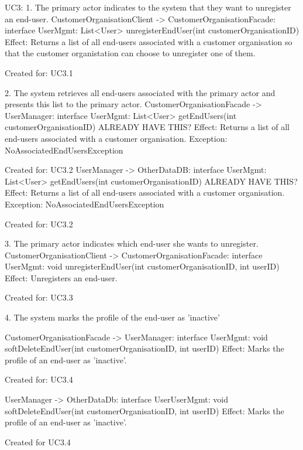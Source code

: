     UC3:
        1. The primary actor indicates to the system that they want to unregister an end-user.
            CustomerOrganisationClient -> CustomerOrganisationFacade: interface UserMgmt: List<User> unregisterEndUser(int customerOrganisationID)
                Effect: Returns a list of all end-users associated with a customer organisation so that the customer organistation can choose to unregister one of them.
                \item Created for: UC3.1

        2. The system retrieves all end-users associated with the primary actor and presents this list to the primary actor.
            CustomerOrganisationFacade -> UserManager: interface UserMgmt: List<User> getEndUsers(int customerOrganisationID) ALREADY HAVE THIS?
                Effect: Returns a list of all end-users associated with a customer organisation.
                Exception: NoAssociatedEndUsersException
                \item Created for: UC3.2
            UserManager -> OtherDataDB: interface UserMgmt: List<User> getEndUsers(int customerOrganisationID) ALREADY HAVE THIS?
                Effect: Returns a list of all end-users associated with a customer organisation.
                Exception: NoAssociatedEndUsersException
                \item Created for: UC3.2

        3. The primary actor indicates which end-user she wants to unregister.
            CustomerOrganisationClient -> CustomerOrganisationFacade: interface UserMgmt: void unregisterEndUser(int customerOrganisationID, int userID)
                Effect: Unregisters an end-user.
                \item Created for: UC3.3

        4. The system marks the profile of the end-user as 'inactive'

            CustomerOrganisationFacade -> UserManager: interface UserMgmt: void softDeleteEndUser(int customerOrganisationID, int userID)
                Effect: Marks the profile of an end-user as 'inactive'.
                \item Created for: UC3.4

            UserManager -> OtherDataDb: interface UserUserMgmt: void softDeleteEndUser(int customerOrganisationID, int userID)
                Effect: Marks the profile of an end-user as 'inactive'.
                \item Created for UC3.4

